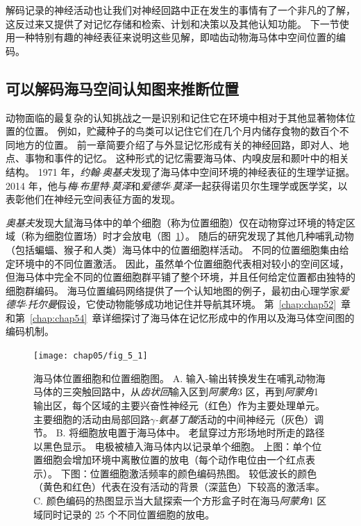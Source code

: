 解码记录的神经活动也让我们对神经回路中正在发生的事情有了一个非凡的了解，这反过来又提供了对记忆存储和检索、计划和决策以及其他认知功能。
下一节使用一种特别有趣的神经表征来说明这些见解，即啮齿动物海马体中空间位置的编码。


\subsection{可以解码海马空间认知图来推断位置}

动物面临的最复杂的认知挑战之一是识别和记住它在环境中相对于其他显著物体位置的位置。
例如，贮藏种子的鸟类可以记住它们在几个月内储存食物的数百个不同地方的位置。
前一章简要介绍了与外显记忆形成有关的神经回路，即对人、地点、事物和事件的记忆。
这种形式的记忆需要海马体、内嗅皮层和颞叶中的相关结构。
1971 年，\textit{约翰$\cdot$奥基夫}发现了海马体中空间环境的神经表征的生理学证据。
2014 年，他与\textit{梅$\cdot$布里特$\cdot$莫泽}和\textit{爱德华$\cdot$莫泽}一起获得诺贝尔生理学或医学奖，以表彰他们在神经元空间表征方面的发现。


\textit{奥基夫}发现大鼠海马体中的单个细胞（称为位置细胞）仅在动物穿过环境的特定区域（称为细胞位置场）时才会放电（图~\ref{fig:5_1}）。
随后的研究发现了其他几种哺乳动物（包括蝙蝠、猴子和人类）海马体中的位置细胞样活动。
不同的位置细胞集由给定环境中的不同位置激活。
因此，虽然单个位置细胞代表相对较小的空间区域，但海马体中完全不同的位置细胞群平铺了整个环境，并且任何给定位置都由独特的细胞群编码。
海马位置编码网络提供了一个认知地图的例子，最初由心理学家\textit{爱德华$\cdot$托尔曼}假设，它使动物能够成功地记住并导航其环境。
第~\ref{chap:chap52}~章和第~\ref{chap:chap54}~章详细探讨了海马体在记忆形成中的作用以及海马体空间图的编码机制。


\begin{figure}[htbp]
	\centering
	\texttt{[image: chap05/fig\_5\_1]}
	\caption{海马体位置细胞和位置细胞图。 
		A. 输入-输出转换发生在哺乳动物海马体的三突触回路中，从\textit{齿状回}输入区到\textit{阿蒙角}3 区，再到\textit{阿蒙角}1 输出区，每个区域的主要兴奋性神经元（红色）作为主要处理单元。
		主要细胞的活动由局部回路\textit{$\gamma$-氨基丁酸}活动的中间神经元（灰色）调节。
		B. 将细胞放电置于海马体中。
		老鼠穿过方形场地时所走的路径以黑色显示。
		电极被植入海马体内以记录单个细胞。
		上图：单个位置细胞会增加环境中离散位置的放电（每个动作电位由一个红点表示）。
		下图：位置细胞激活频率的颜色编码热图。
		较低波长的颜色（黄色和红色）代表在没有活动的背景（深蓝色）下较高的激活率。 
		C. 颜色编码的热图显示当大鼠探索一个方形盒子时在海马\textit{阿蒙角}1 区域同时记录的 25 个不同位置细胞的放电。}
	\label{fig:5_1}
\end{figure}


